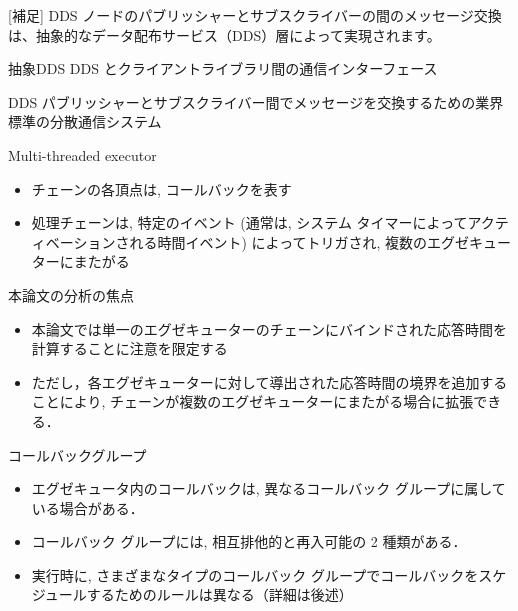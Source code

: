 \begin{frame}{[補足] DDS}
    ノードのパブリッシャーとサブスクライバーの間のメッセージ交換は、抽象的なデータ配布サービス（DDS）層によって実現されます。

    \begin{block}{抽象DDS}
        DDS とクライアントライブラリ間の通信インターフェース
    \end{block}
    \begin{block}{DDS}
        パブリッシャーとサブスクライバー間でメッセージを交換するための業界標準の分散通信システム
    \end{block}
\end{frame}

\begin{frame}{Multi-threaded executor}
    \begin{itemize}
        \item チェーンの各頂点は, コールバックを表す
        \item 処理チェーンは, 特定のイベント (通常は, システム タイマーによってアクティベーションされる時間イベント) によってトリガされ, 複数のエグゼキューターにまたがる
    \end{itemize}

    \centering
\end{frame}

\begin{frame}{本論文の分析の焦点}
    \begin{itemize}
        \item 本論文では単一のエグゼキューターのチェーンにバインドされた応答時間を計算することに注意を限定する
        \item ただし，各エグゼキューターに対して導出された応答時間の境界を追加することにより, チェーンが複数のエグゼキューターにまたがる場合に拡張できる．
    \end{itemize}

    \centering
\end{frame}

\begin{frame}{コールバックグループ}
    \begin{itemize}
        \item エグゼキュータ内のコールバックは, 異なるコールバック グループに属している場合がある．
        \item コールバック グループには, 相互排他的と再入可能の 2 種類がある．
        \item 実行時に, さまざまなタイプのコールバック グループでコールバックをスケジュールするためのルールは異なる（詳細は後述）
    \end{itemize}
\end{frame}

